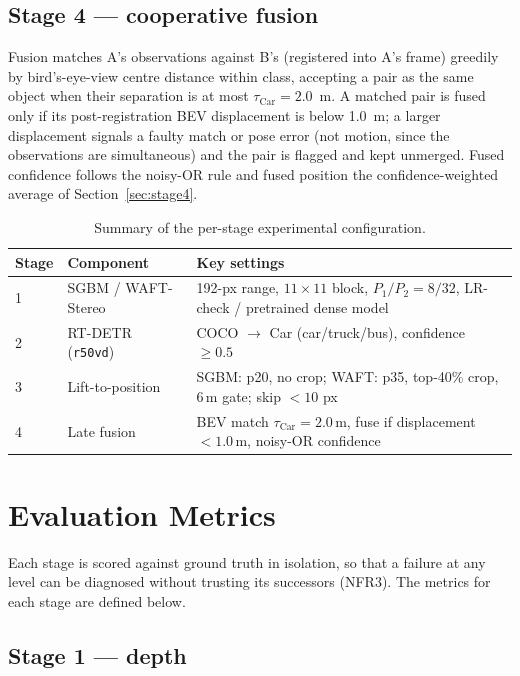 \subsection{Stage 4 --- cooperative fusion}

Fusion matches A's observations against B's (registered into A's frame) greedily by
bird's-eye-view centre distance within class, accepting a pair as the same object
when their separation is at most $\tau_{\text{Car}}=2.0$~m. A matched pair is fused
only if its post-registration BEV displacement is below 1.0~m; a larger displacement
signals a faulty match or pose error (not motion, since the observations are
simultaneous) and the pair is flagged and kept unmerged. Fused confidence follows the
noisy-OR rule and fused position the confidence-weighted average of
Section~\ref{sec:stage4}.

\begin{table}[htbp]
\centering
\caption{Summary of the per-stage experimental configuration.}
\label{tab:configsummary}
\renewcommand{\arraystretch}{1.3}
\begin{tabularx}{\textwidth}{@{}llL@{}}
\toprule
\textbf{Stage} & \textbf{Component} & \textbf{Key settings} \\
 & SGBM / WAFT-Stereo & 192-px range, $11\times11$ block, $P_1/P_2=8/32$, LR-check / pretrained dense model \\
2 & RT-DETR (\texttt{r50vd}) & COCO $\rightarrow$ Car (car/truck/bus), confidence $\ge 0.5$ \\
3 & Lift-to-position & SGBM: p20, no crop; WAFT: p35, top-40\% crop, 6\,m gate; skip $<10$ px \\
4 & Late fusion & BEV match $\tau_{\text{Car}}=2.0$\,m, fuse if displacement $<1.0$\,m, noisy-OR confidence \\
\bottomrule
\end{tabularx}
\end{table}

\section{Evaluation Metrics}
\label{sec:metrics}

Each stage is scored against ground truth in isolation, so that a failure at any
level can be diagnosed without trusting its successors (NFR3). The metrics for each
stage are defined below.

\subsection{Stage 1 --- depth}

